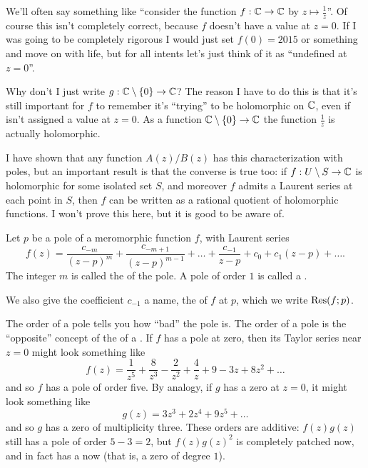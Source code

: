 \begin{abuse}
	We'll often say something like ``consider the function $f : \mathbb C \to \mathbb C$ by $z \mapsto \frac 1z$''.
	Of course this isn't completely correct, because $f$ doesn't have a value at $z=0$.
	If I was going to be completely rigorous I would just set $f(0) = 2015$ or something and move on
	with life, but for all intents let's just think of it as ``undefined at $z=0$''.

	Why don't I just write $g : \mathbb C \setminus \{0\} \to \mathbb C$?
	The reason I have to do this is that it's still important 
	for $f$ to remember it's ``trying'' to be holomorphic on $\mathbb C$,
	even if isn't assigned a value at $z=0$.
	As a function $\mathbb C \setminus \{0\} \to \mathbb C$ the function $\frac 1z$ is actually holomorphic.
\end{abuse}

\begin{remark}
	I have shown that any function $A(z)/B(z)$
	has this characterization with poles,
	but an important result is
	that the converse is true too:
	if $f : U \setminus S \to \mathbb C$ is holomorphic for some isolated set $S$,
	and moreover $f$ admits a Laurent series at each point in $S$,
	then $f$ can be written as a rational quotient of holomorphic functions.
	I won't prove this here, but it is good to be aware of.
\end{remark}

\begin{definition}
	Let $p$ be a pole of a meromorphic function $f$, with Laurent series
	\[ 
		f(z) =
		\frac{c_{-m}}{(z-p)^m}
		+ \frac{c_{-m+1}}{(z-p)^{m-1}}
		+ \dots
		+ \frac{c_{-1}}{z-p} + c_0 + c_1 (z-p) + \dots.
	\]
	The integer $m$ is called the  of the pole.
	A pole of order $1$ is called a .
	
	We also give the coefficient $c_{-1}$ a name, the  of $f$ at $p$,
	which we write $\operatorname{Res}(f;p)$.
\end{definition}

The order of a pole tells you how ``bad'' the pole is.
The order of a pole is the ``opposite'' concept of the  of a .
If $f$ has a pole at zero, then its Taylor series near $z=0$ might look something like
\[ f(z) = \frac{1}{z^5} + \frac{8}{z^3} - \frac{2}{z^2} + \frac{4}{z} + 9 - 3z + 8z^2 + \dots \]
and so $f$ has a pole of order five.
By analogy, if $g$ has a zero at $z=0$, it might look something like
\[ g(z) = 3z^3 + 2z^4 + 9z^5 + \dots \]
and so $g$ has a zero of multiplicity three.
These orders are additive: $f(z) g(z)$ still has a pole of order $5-3=2$,
but $f(z)g(z)^2$ is completely patched now, and in fact has a  now
(that is, a zero of degree $1$).

